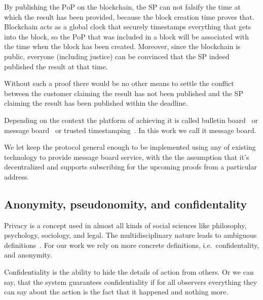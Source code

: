 \documentclass{ieeeaccess}
\begin{document}
By publishing the $\mathrm{PoP}$ on the blockchain, the SP can not falsify the time
at which the result has been provided, because the block creation time
proves that. Blockchain acts as a global clock that securely timestamps
everything that gets into the block, so the $\mathrm{PoP}$ that was included in a
block will be associated with the time when the block has been created. Moreover, since the blockchain is public, everyone (including justice) can be convinced that the SP indeed published the result at that time.

Without such a proof there would be no other means to settle the conflict between the customer claiming the result has not been published and the SP claiming the result has been published within the deadline.

Depending on the context the platform of achieving it is called bulletin board~\cite{achenbach2015improved} or message board~\cite{hinarejos2019solution} or trusted timestamping~\cite{gipp2015decentralized}. In this work we call it message board.



We let keep the protocol general enough to 
be implemented using any of  
existing technology to provide message board service, with the
the assumption that it's decentralized and supports subscribing for the
upcoming proofs from a particular address.



\subsection{Anonymity, pseudonomity, and confidentality}\label{sec:pseudo-anon}


Privacy is a concept used in almost all kinds of social sciences like philosophy, psychology, sociology, and legal. The multidisciplinary nature leads to ambiguous definitions~\cite{smith2011information}. For our work we rely on more concrete definitions, i.e.~confidentality, and anonymity.

Confidentiality is the ability to hide the details of action from others. Or we can say, that the system guarantees confidentiality if for all observers everything they can say about the action is the fact that it happened and nothing more.
\end{document}
